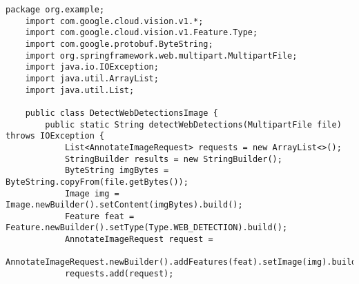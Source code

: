 \begin{lstlisting}[caption={Voorbeeld van een Java-klasse die de Google Vision API gebruikt om webdetecties te vinden. Gebaseerd op de documentatie van \autocite{googleVisionAPI}},label={lst:googlevisioncode}]
    package org.example;
    import com.google.cloud.vision.v1.*;
    import com.google.cloud.vision.v1.Feature.Type;
    import com.google.protobuf.ByteString;
    import org.springframework.web.multipart.MultipartFile;
    import java.io.IOException;
    import java.util.ArrayList;
    import java.util.List;
    
    public class DetectWebDetectionsImage {
        public static String detectWebDetections(MultipartFile file) throws IOException {
            List<AnnotateImageRequest> requests = new ArrayList<>();
            StringBuilder results = new StringBuilder();
            ByteString imgBytes = ByteString.copyFrom(file.getBytes());
            Image img = Image.newBuilder().setContent(imgBytes).build();
            Feature feat = Feature.newBuilder().setType(Type.WEB_DETECTION).build();
            AnnotateImageRequest request =
            AnnotateImageRequest.newBuilder().addFeatures(feat).setImage(img).build();
            requests.add(request);
            

\end{lstlisting}
